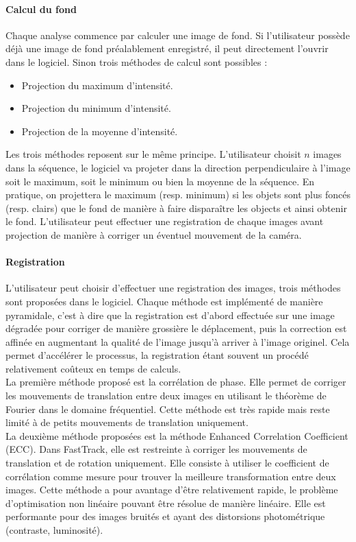 		\paragraph{Calcul du fond}
		Chaque analyse commence par calculer une image de fond. Si l'utilisateur possède déjà une image de fond préalablement enregistré, il peut directement l'ouvrir dans le logiciel. Sinon trois méthodes de calcul sont possibles :
		\begin{itemize}
			\item Projection du maximum d'intensité.
			\item Projection du minimum d'intensité.
			\item Projection de la moyenne d'intensité.		
		\end{itemize}
		Les trois méthodes reposent sur le même principe. L'utilisateur choisit $n$ images dans la séquence, le logiciel va projeter dans la direction perpendiculaire à l'image soit le maximum, soit le minimum ou bien la moyenne de la séquence. En pratique, on projettera le maximum (resp. minimum) si les objets sont plus foncés (resp. clairs) que le fond de manière à faire disparaître les objects et ainsi obtenir le fond. L'utilisateur peut effectuer une registration de chaque images avant projection de manière à corriger un éventuel mouvement de la caméra.
		
		
		\paragraph{Registration}
		L'utilisateur peut choisir d'effectuer une registration des images, trois méthodes sont proposées dans le logiciel. Chaque méthode est implémenté de manière pyramidale, c'est à dire que la registration est d'abord effectuée sur une image dégradée pour corriger de manière grossière le déplacement, puis la correction est affinée en augmentant la qualité de l'image jusqu'à arriver à l'image originel. Cela permet d'accélérer le processus, la registration étant souvent un procédé relativement coûteux en temps de calculs.\\
		
		La première méthode proposé est la corrélation de phase. Elle permet de corriger les mouvements de translation entre deux images en utilisant le théorème de Fourier dans le domaine fréquentiel. Cette méthode est très rapide mais reste limité à de petits mouvements de translation uniquement.\\
		
		La deuxième méthode proposées est la méthode Enhanced Correlation Coefficient (ECC). Dans FastTrack, elle est restreinte à corriger les mouvements de translation et de rotation uniquement. Elle consiste à utiliser le coefficient de corrélation comme mesure pour trouver la meilleure transformation entre deux images. Cette méthode a pour avantage d'être relativement rapide, le problème d'optimisation non linéaire pouvant être résolue de manière linéaire. Elle est performante pour des images bruités et ayant des distorsions photométrique (contraste, luminosité).\\
		
